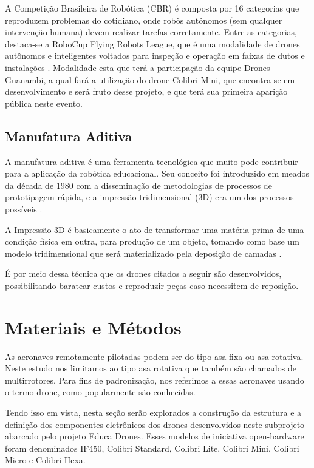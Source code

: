 \documentclass[conference]{IEEEtran}
\begin{document}
A Competição Brasileira de Robótica (CBR) é composta por 16 categorias que reproduzem problemas do cotidiano, onde robôs autônomos (sem qualquer intervenção humana) devem realizar tarefas corretamente. Entre as categorias, destaca-se a RoboCup Flying Robots League, que é uma modalidade de drones autônomos e inteligentes voltados para inspeção e operação em faixas de dutos e instalações \cite{b3}. Modalidade esta que terá a participação da equipe Drones Guanambi, a qual fará a utilização do drone Colibri Mini, que encontra-se em desenvolvimento e será fruto desse projeto, e que terá sua primeira aparição pública neste evento.

\subsection{Manufatura Aditiva}

A manufatura aditiva é uma ferramenta tecnológica que muito pode contribuir para a aplicação da robótica educacional. Seu conceito foi introduzido em meados da década de 1980 com a disseminação de metodologias de processos de prototipagem rápida, e a impressão tridimensional (3D) era um dos processos possíveis \cite{b10}.

A Impressão 3D é basicamente o ato de transformar uma matéria prima de uma condição física em outra, para produção de um objeto, tomando como base um modelo tridimensional que será materializado pela deposição de camadas \cite{b8}. 

É por meio dessa técnica que os drones citados a seguir são desenvolvidos, possibilitando baratear custos e reproduzir peças caso necessitem de reposição.

\section{Materiais e Métodos}

As aeronaves remotamente pilotadas podem ser do tipo asa fixa ou asa rotativa. Neste estudo nos limitamos ao tipo asa rotativa que também são chamados de multirrotores. Para fins de padronização, nos referimos a essas aeronaves usando o termo drone, como popularmente são conhecidas.

Tendo isso em vista, nesta seção serão explorados a construção da estrutura e a definição dos componentes eletrônicos dos drones desenvolvidos neste subprojeto abarcado pelo projeto Educa Drones. Esses modelos de iniciativa open-hardware foram denominados IF450, Colibri Standard, Colibri Lite, Colibri Mini, Colibri Micro e Colibri Hexa.
\end{document}
